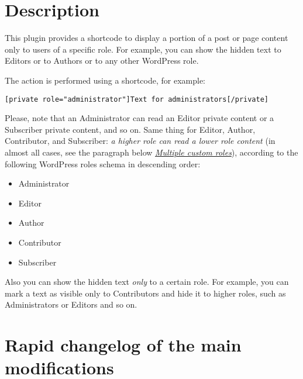 \documentclass[a4paper,11pt]{article}
\begin{document}
\section{Description}

This plugin provides a shortcode to display a portion of a post or page content only to users of a specific role. For example, you can show the hidden text to Editors or to Authors or to any other WordPress role.

The action is performed using a shortcode, for example:

\begin{lstlisting}
[private role="administrator"]Text for administrators[/private]
\end{lstlisting}

Please, note that an Administrator can read an Editor private content or a Subscriber private content, and so on. Same thing for Editor, Author, Contributor, and Subscriber: \textit{a higher role can read a lower role content} (in almost all cases, see the paragraph below \textit{\hyperref[multiple-custom-roles]{Multiple custom roles}}), according to the following WordPress roles schema in descending order:

\begin{itemize}
 \item Administrator
 \item Editor
 \item Author
 \item Contributor
 \item Subscriber
\end{itemize}

Also you can show the hidden text \textit{only} to a certain role. For example, you can mark a text as visible only to Contributors and hide it to higher roles, such as Administrators or Editors and so on.

\section{Rapid changelog of the main modifications}
\end{document}
